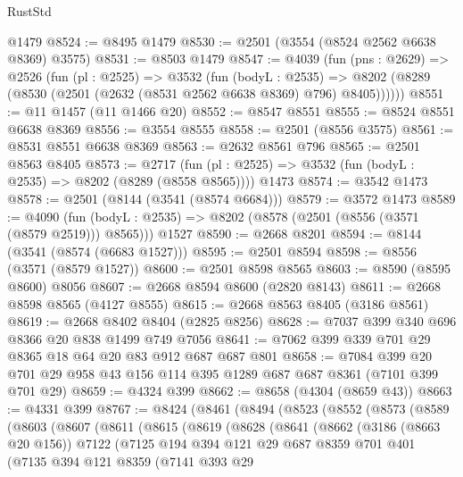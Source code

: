 \begin{lexlean}{RustStd}
\begin{coremodule}
    @1479
@8524 := @8495 @1479
@8530 := @2501 (@3554 (@8524 @2562 @6638 @8369) @3575)
@8531 := @8503 @1479
@8547 := @4039
    (fun (pns : @2629) =>
    @2526
      (fun (pl : @2525) =>
      @3532
        (fun (bodyL : @2535) =>
        @8202 (@8289 (@8530 (@2501 (@2632 (@8531 @2562 @6638 @8369) @796) @8405))))))
@8551 := @11 @1457 (@11 @1466 @20)
@8552 := @8547 @8551
@8555 := @8524 @8551 @6638 @8369
@8556 := @3554 @8555
@8558 := @2501 (@8556 @3575)
@8561 := @8531 @8551 @6638 @8369
@8563 := @2632 @8561 @796
@8565 := @2501 @8563 @8405
@8573 := @2717
    (fun (pl : @2525) => @3532 (fun (bodyL : @2535) => @8202 (@8289 (@8558 @8565))))
    @1473
@8574 := @3542 @1473
@8578 := @2501 (@8144 (@3541 (@8574 @6684)))
@8579 := @3572 @1473
@8589 := @4090
    (fun (bodyL : @2535) => @8202 (@8578 (@2501 (@8556 (@3571 (@8579 @2519))) @8565)))
    @1527
@8590 := @2668 @8201
@8594 := @8144 (@3541 (@8574 (@6683 @1527)))
@8595 := @2501 @8594
@8598 := @8556 (@3571 (@8579 @1527))
@8600 := @2501 @8598 @8565
@8603 := @8590 (@8595 @8600) @8056
@8607 := @2668 @8594 @8600 (@2820 @8143)
@8611 := @2668 @8598 @8565 (@4127 @8555)
@8615 := @2668 @8563 @8405 (@3186 @8561)
@8619 := @2668 @8402 @8404 (@2825 @8256)
@8628 := @7037 @399 @340 @696 @8366 @20 @838 @1499 @749 @7056
@8641 := @7062 @399 @339 @701 @29 @8365 @18 @64 @20 @83 @912 @687 @687 @801
@8658 := @7084 @399 @20 @701 @29 @958 @43 @156 @114 @395 @1289 @687 @687 @8361 (@7101 @399 @701 @29)
@8659 := @4324 @399
@8662 := @8658 (@4304 (@8659 @43))
@8663 := @4331 @399
@8767 := @8424
    (@8461
      (@8494
        (@8523
          (@8552
            (@8573
              (@8589
                (@8603
                  (@8607
                    (@8611
                      (@8615
                        (@8619
                          (@8628
                            (@8641
                              (@8662
                                (@3186 (@8663 @20 @156))
                                @7122
                                (@7125
                                  @194
                                  @394
                                  @121
                                  @29
                                  @687
                                  @8359
                                  @701
                                  @401
                                  (@7135
                                    @394
                                    @121
                                    @8359
                                    (@7141
                                      @393
                                      @29

\end{coremodule}
\end{lexlean}
